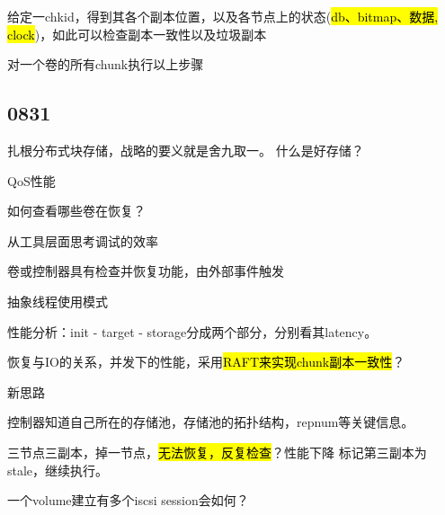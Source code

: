 \begin{enumbox}
\item 给定一chkid，得到其各个副本位置，以及各节点上的状态(\hl{db、bitmap、数据, clock})，如此可以检查副本一致性以及垃圾副本
\item 对一个卷的所有chunk执行以上步骤
\end{enumbox}

\subsection{0831}

扎根分布式块存储，战略的要义就是舍九取一。
什么是好存储？

\begin{enumbox}
\item QoS性能
\item 如何查看哪些卷在恢复？
\item 从工具层面思考调试的效率
\item 卷或控制器具有检查并恢复功能，由外部事件触发
\item 抽象线程使用模式
\item 性能分析：init - target - storage分成两个部分，分别看其latency。
\item 恢复与IO的关系，并发下的性能，采用\hl{RAFT来实现chunk副本一致性}？
\end{enumbox}

新思路
\begin{enumbox}
\item 控制器知道自己所在的存储池，存储池的拓扑结构，repnum等关键信息。
\end{enumbox}

三节点三副本，掉一节点，\hl{无法恢复，反复检查}？性能下降
标记第三副本为stale，继续执行。

一个volume建立有多个iscsi session会如何？
